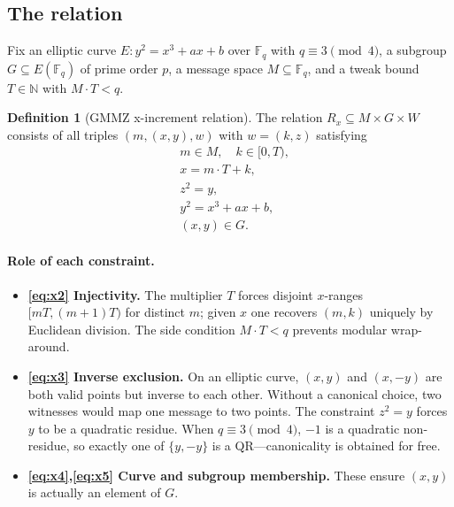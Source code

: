 \documentclass[11pt,a4paper]{article}
\theoremstyle{definition}
\newtheorem{definition}[theorem]{Definition}
\newcommand{\F}{\mathbb{F}}
\newcommand{\N}{\mathbb{N}}
\begin{document}
\subsection{The relation}

Fix an elliptic curve $E : y^2 = x^3 + ax + b$ over $\F_q$ with $q \equiv 3
\pmod 4$, a subgroup $G \subseteq E(\F_q)$ of prime order $p$, a message
space $M \subseteq \F_q$, and a tweak bound $T \in \N$ with $M \cdot T < q$.

\begin{definition}[GMMZ x-increment relation]
\label{def:x-increment}
The relation $R_x \subseteq M \times G \times W$ consists of all triples
$(m,(x,y),w)$ with $w = (k,z)$ satisfying
\begin{align}
  & m \in M, \quad k \in [0,T), \label{eq:x1}\\
  & x = m \cdot T + k, \label{eq:x2}\\
  & z^2 = y, \label{eq:x3}\\
  & y^2 = x^3 + a x + b, \label{eq:x4}\\
  & (x,y) \in G. \label{eq:x5}
\end{align}
\end{definition}

\paragraph{Role of each constraint.}
\begin{itemize}
  \item \textbf{\eqref{eq:x2} Injectivity.} The multiplier $T$ forces disjoint
  $x$-ranges $[mT, (m{+}1)T)$ for distinct $m$; given $x$ one recovers
  $(m,k)$ uniquely by Euclidean division. The side condition $M \cdot T < q$
  prevents modular wrap-around.

  \item \textbf{\eqref{eq:x3} Inverse exclusion.} On an elliptic curve,
  $(x,y)$ and $(x,-y)$ are both valid points but inverse to each other.
  Without a canonical choice, two witnesses would map one message to two
  points. The constraint $z^2 = y$ forces $y$ to be a quadratic residue. When
  $q \equiv 3 \pmod 4$, $-1$ is a quadratic non-residue, so exactly one of
  $\{y, -y\}$ is a QR—canonicality is obtained for free.

  \item \textbf{\eqref{eq:x4},\eqref{eq:x5} Curve and subgroup membership.}
  These ensure $(x,y)$ is actually an element of $G$.
\end{itemize}
\end{document}
